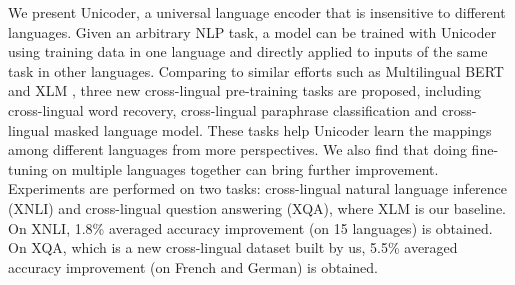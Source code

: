 We present Unicoder, a universal language encoder that is insensitive to different languages. Given an arbitrary NLP task, a model can be trained with Unicoder using training data in one language and directly applied to inputs of the same task in other languages.
Comparing to similar efforts such as Multilingual BERT and XLM , three new cross-lingual pre-training tasks are proposed, including cross-lingual word recovery, cross-lingual paraphrase classification and cross-lingual masked language model. These tasks help Unicoder learn the mappings among different languages from more perspectives. We also find that doing fine-tuning on multiple languages together can bring further improvement.
Experiments are performed on two tasks: cross-lingual natural language inference (XNLI) and cross-lingual question answering (XQA), where XLM is our baseline. On XNLI, 1.8\% averaged accuracy improvement (on 15 languages) is obtained. On XQA, which is a new cross-lingual dataset built by us, 5.5\% averaged accuracy improvement (on French and German) is obtained.